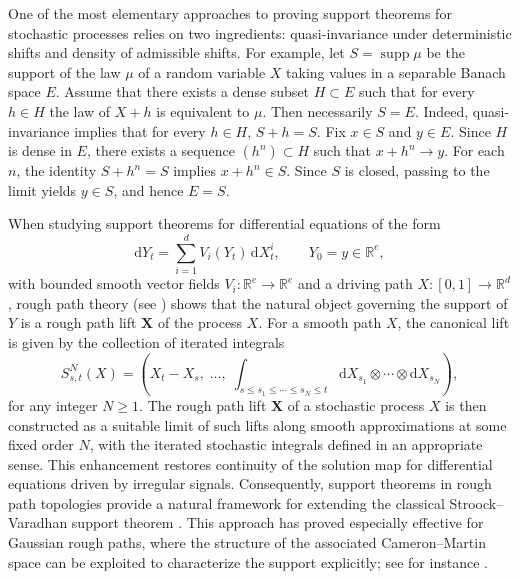 \documentclass[12pt,a4paper]{article}
\numberwithin{equation}{section}
\theoremstyle{plain}
\theoremstyle{definition}
\theoremstyle{remark}
\begin{document}
One of the most elementary approaches to proving support theorems for stochastic
processes relies on two ingredients: quasi-invariance under deterministic shifts and
density of admissible shifts. For example, let $S = \operatorname{supp} \mu$ be the
support of the law $\mu$ of a random variable $X$ taking values in a separable Banach
space $E$. Assume that there exists a dense subset $H \subset E$ such that for every
$h \in H$ the law of $X + h$ is equivalent to $\mu$. Then necessarily $S = E$.
Indeed, quasi-invariance implies that for every $h \in H$, $S + h = S$. Fix $x \in S$
and $y \in E$. Since $H$ is dense in $E$, there exists a sequence $(h^n) \subset H$
such that $x + h^n \to y$. For each $n$, the identity $S + h^n = S$ implies
$x + h^n \in S$. Since $S$ is closed, passing to the limit yields $y \in S$, and
hence $E = S$.

When studying support theorems for differential equations of the form
\[
    \mathrm{d}Y_t = \sum_{i=1}^d V_i(Y_t)\,\mathrm{d}X^i_t,
    \qquad Y_0 = y \in \mathbb{R}^e,
\]
with bounded smooth vector fields $V_i : \mathbb{R}^e \to \mathbb{R}^e$ and a driving
path $X : [0,1] \to \mathbb{R}^d$, rough path theory (see
\cite{lyons1998, frizbook, FH20}) shows that the natural object governing the support
of $Y$ is a rough path lift $\mathbf{X}$ of the process $X$. For a smooth path $X$,
the canonical lift is given by the collection of iterated integrals
\begin{equation}\label{eq:p_lift}
    S_{s,t}^{N}(X) = \left(
        X_t - X_s,\;
        \ldots,\;
        \int_{s \leq s_1 \leq \cdots \leq s_{N} \leq t}
        \mathrm{d}X_{s_1} \otimes \cdots \otimes \mathrm{d}X_{s_{N}}
    \right),
\end{equation}
for any integer $N\geq 1$. The rough path lift $\mathbf{X}$ of a stochastic process $X$ is then constructed as a suitable limit of such lifts along smooth approximations at some fixed order $N$, with
the iterated stochastic integrals defined in an appropriate sense. This enhancement restores continuity of the solution
map for differential equations driven by irregular signals. Consequently, support
theorems in rough path topologies provide a natural framework for extending the
classical Stroock--Varadhan support theorem \cite{SV72}. This approach has proved
especially effective for Gaussian rough paths, where the structure of the associated
Cameron--Martin space can be exploited to characterize the support explicitly; see
for instance \cite{LQZ02, FV10gaussian}.
\end{document}
